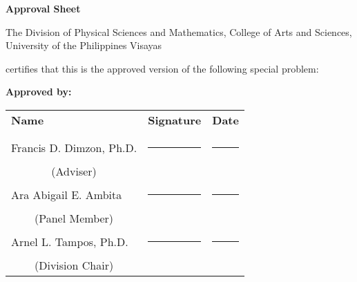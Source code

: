 \begin{center}
    \textbf{Approval Sheet}

    The Division of Physical Sciences and Mathematics, College of Arts and Sciences, University of the Philippines Visayas

    certifies that this is the approved version of the following special problem:

    \end{center}

    {\small\textbf{Approved by:}}

    \newcommand{\signaturerule}{\rule{10em}{.4pt}}
        \begin{tabular}{lll}
            \bfseries Name  & \bfseries Signature & \bfseries Date\\ \\
            Francis D. Dimzon, Ph.D. &\signaturerule  & \signaturerule\\
            \multicolumn{1}{c}{(Adviser)} \\
            Ara Abigail E. Ambita &\signaturerule &\signaturerule\\
            \multicolumn{1}{c}{(Panel Member)}  \\
            Arnel L. Tampos, Ph.D. &\signaturerule &\signaturerule\\
            \multicolumn{1}{c}{(Division Chair)}

        \end{tabular}
